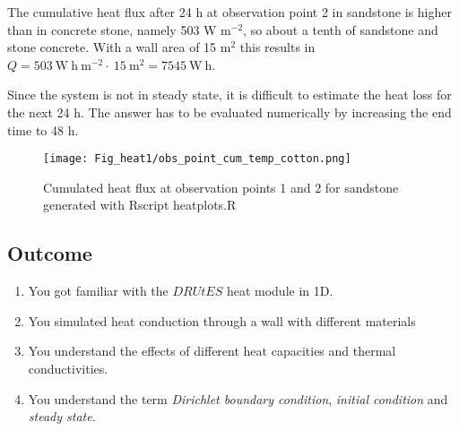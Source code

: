 The cumulative heat flux after 24 h at observation point 2 in sandstone is higher than in concrete stone, namely 503 W m$^{-2}$, so about a tenth of sandstone and stone concrete. With a wall area of 15 m$^2$ this results in $Q = 503~\mathrm{W~h~m^{-2}}\cdot~15~\mathrm{m^{2}}= 7545 ~\mathrm{W~h}$. 

Since the system is not in steady state, it is difficult to estimate the heat loss for the next 24 h. The answer has to be evaluated numerically by increasing the end time to 48 h. 

\begin{figure}[!h]
\centering
\texttt{[image: Fig\_heat1/obs\_point\_cum\_temp\_cotton.png]}
\caption{\label{plot9} Cumulated heat flux at observation points 1 and 2 for sandstone generated with Rscript heatplots.R}
\end{figure}

\newpage
\newpage

\subsection{Outcome}
\begin{enumerate}
\item You got familiar with the $DRUtES$ heat module in 1D.
\item You simulated heat conduction through a wall with different materials
\item You understand the effects of different heat capacities and thermal conductivities.
\item You understand the term \emph{Dirichlet boundary condition}, \emph{initial condition} and \emph{steady state}.
\end{enumerate}
